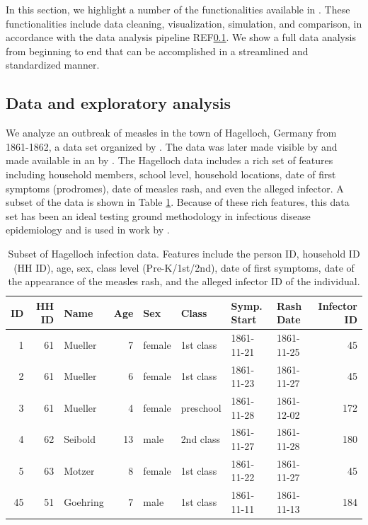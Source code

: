 \documentclass[
  shortnames]{jss}
\begin{document}
In this section, we highlight a number of the functionalities available
in . These functionalities include data cleaning,
visualization, simulation, and comparison, in accordance with the data
analysis pipeline REF\ref{}. We show a full data analysis from beginning
to end that can be accomplished in a streamlined and standardized
manner.

\subsection{Data and exploratory analysis}

We analyze an outbreak of measles in the town of Hagelloch, Germany from
1861-1862, a data set organized by \cite{pfeilsticker1863}. The data was
later made visible by \cite{oesterle1992} and made available in an
 by \cite{surveillance2017}. The Hagelloch data includes a
rich set of features including household members, school level,
household locations, date of first symptoms (prodromes), date of measles
rash, and even the alleged infector. A subset of the data is shown in
Table \ref{tab:hags-people}. Because of these rich features, this data
set has been an ideal testing ground methodology in infectious disease
epidemiology and is used in work by
\cite{Neal2004,britton2011,groendyke2012,becker2016}.

\begin{CodeChunk}
\begin{table}[!h]

\caption{\label{tab:hags-people}Subset of Hagelloch infection data.  Features include the person ID, household ID (HH ID), age, sex, class level (Pre-K/1st/2nd), date of first symptoms, date of the appearance of the measles rash, and the alleged infector ID of the individual.}
\centering
\begin{tabular}[t]{rrlrllllr}
\toprule
ID & HH ID & Name & Age & Sex & Class & Symp. Start & Rash Date & Infector ID\\
\midrule
1 & 61 & Mueller & 7 & female & 1st class & 1861-11-21 & 1861-11-25 & 45\\
2 & 61 & Mueller & 6 & female & 1st class & 1861-11-23 & 1861-11-27 & 45\\
3 & 61 & Mueller & 4 & female & preschool & 1861-11-28 & 1861-12-02 & 172\\
4 & 62 & Seibold & 13 & male & 2nd class & 1861-11-27 & 1861-11-28 & 180\\
5 & 63 & Motzer & 8 & female & 1st class & 1861-11-22 & 1861-11-27 & 45\\
45 & 51 & Goehring & 7 & male & 1st class & 1861-11-11 & 1861-11-13 & 184\\
\bottomrule
\end{tabular}
\end{table}

\end{CodeChunk}
\end{document}
